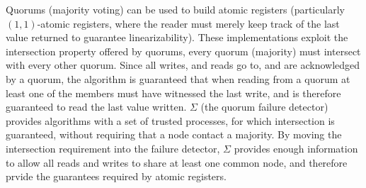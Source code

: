 Quorums (majority voting) can be used to build atomic registers (particularly $(1, 1)$-atomic registers, where the
reader must merely keep track of the last value returned to guarantee linearizability). These implementations exploit
the intersection property offered by quorums, \ie every quorum (majority) must intersect with every other quorum. Since
all writes, and reads go to, and are acknowledged by a quorum, the algorithm is guaranteed that when reading from a
quorum at least one of the members must have witnessed the last write, and is therefore guaranteed to read the last
value written. $\Sigma$ (the quorum failure detector) provides algorithms with a set of trusted processes, for which
intersection is guaranteed, without requiring that a node contact a majority. By moving the intersection requirement
into the  failure detector, $\Sigma$ provides enough information to allow all reads and writes to share at least one
common node, and therefore prvide the guarantees required by atomic registers. 
